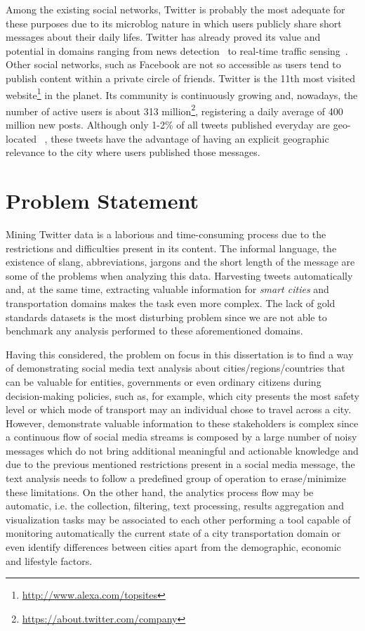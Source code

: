 Among the existing social networks, Twitter is probably the most adequate for these purposes due to its microblog nature in which users publicly share short messages about their daily lifes. Twitter has already proved its value and potential in domains ranging from news detection~\cite{kn:Sankaranarayanan2009} to real-time traffic sensing~\cite{carvalho2010real}. Other social networks, such as Facebook are not so accessible as users tend to publish content within a private circle of friends. Twitter is the 11th most visited website\footnote{\url{http://www.alexa.com/topsites}} in the planet. Its community is continuously growing and, nowadays, the number of active users is about 313 million\footnote{\url{https://about.twitter.com/company}}, registering a daily average of 400 million new posts. Although only 1-2\% of all tweets published everyday are geo-located ~\cite{ikeda2013twitter}, these tweets have the advantage of having an explicit geographic relevance to the city where users published those messages.

\section{Problem Statement}\label{sec:problem}

Mining Twitter data is a laborious and time-consuming process due to the restrictions and difficulties present in its content. The informal language, the existence of slang, abbreviations, jargons and the short length of the message are some of the problems when analyzing this data. Harvesting tweets automatically and, at the same time, extracting valuable information for \textit{smart cities} and transportation domains makes the task even more complex. The lack of gold standards datasets is the most disturbing problem since we are not able to benchmark any analysis performed to these aforementioned domains.

Having this considered, the problem on focus in this dissertation is to find a way of demonstrating social media text analysis about cities/regions/countries that can be valuable for entities, governments or even ordinary citizens during decision-making policies, such as, for example, which city presents the most safety level or which mode of transport may an individual chose to travel across a city. However, demonstrate valuable information to these stakeholders is complex since a continuous flow of social media streams is composed by a large number of noisy messages which do not bring additional meaningful and actionable knowledge and due to the previous mentioned restrictions present in a social media message, the text analysis needs to follow a predefined group of operation to erase/minimize these limitations. On the other hand, the analytics process flow may be automatic, i.e. the collection, filtering, text processing, results aggregation and visualization tasks may be associated to each other performing a tool capable of monitoring automatically the current state of a city transportation domain or even identify differences between cities apart from the demographic, economic and lifestyle factors.


